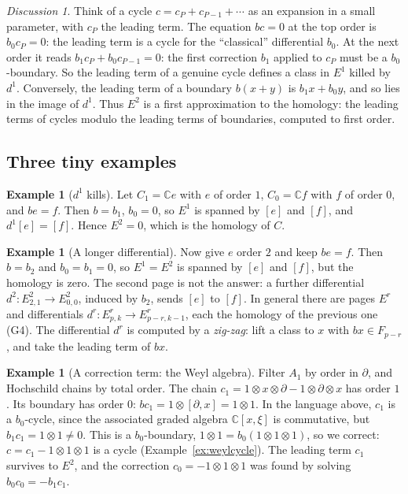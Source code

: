\documentclass[11pt,oneside,reqno]{article}
\newcommand{\C}{\mathbb C}
\newcommand{\pa}{\partial}
\theoremstyle{plain}
\theoremstyle{definition}
\newtheorem{example}[theorem]{Example}
\theoremstyle{remark}
\newtheorem*{discussion}{Discussion}
\begin{document}
\begin{discussion}
Think of a cycle \(c=c_P+c_{P-1}+\cdots\) as an expansion in a small parameter,
with \(c_P\) the leading term. The equation \(bc=0\) at the top order is
\(b_0c_P=0\): the leading term is a cycle for the ``classical'' differential
\(b_0\). At the next order it reads \(b_1c_P+b_0c_{P-1}=0\): the first correction
\(b_1\) applied to \(c_P\) must be a \(b_0\)-boundary. So the leading term of a
genuine cycle defines a class in \(E^1\) killed by \(d^1\). Conversely, the
leading term of a boundary \(b(x+y)\) is \(b_1x+b_0y\), and so lies in the
image of \(d^1\). Thus \(E^2\) is a first approximation to the homology: the
leading terms of cycles modulo the leading terms of boundaries, computed to
first order.
\end{discussion}

\subsection{Three tiny examples}\label{subsec:tiny}
\begin{example}[\(d^1\) kills]\label{ex:tiny1}
Let \(C_1=\C e\) with \(e\) of order \(1\), \(C_0=\C f\) with \(f\) of order \(0\),
and \(be=f\). Then \(b=b_1\), \(b_0=0\), so \(E^1\) is spanned by \([e]\) and \([f]\),
and \(d^1[e]=[f]\). Hence \(E^2=0\), which is the homology of \(C\).
\end{example}

\begin{example}[A longer differential]\label{ex:tiny2}
Now give \(e\) order \(2\) and keep \(be=f\). Then \(b=b_2\) and
\(b_0=b_1=0\), so \(E^1=E^2\) is spanned by \([e]\) and \([f]\), but the homology
is zero. The second page is not the answer: a further differential
\(d^2:E^2_{2,1}\to E^2_{0,0}\), induced by \(b_2\), sends \([e]\) to \([f]\). In
general there are pages \(E^r\) and differentials \(d^r:E^r_{p,k}\to
E^r_{p-r,k-1}\), each the homology of the previous one (G4). The differential
\(d^r\) is computed by a \emph{zig-zag}: lift a class to \(x\) with
\(bx\in F_{p-r}\), and take the leading term of \(bx\).
\end{example}

\begin{example}[A correction term: the Weyl algebra]\label{ex:tiny3}
Filter \(A_1\) by order in \(\pa\), and Hochschild chains by total order. The
chain \(c_1=1\otimes x\otimes\pa-1\otimes\pa\otimes x\) has order \(1\). Its boundary has
order \(0\): \(bc_1=1\otimes[\pa,x]=1\otimes1\). In the language above, \(c_1\) is a
\(b_0\)-cycle, since the associated graded algebra \(\C[x,\xi]\) is commutative,
but \(b_1c_1=1\otimes1\neq0\). This is a \(b_0\)-boundary, \(1\otimes1=b_0(1\otimes1\otimes1)\),
so we correct: \(c=c_1-1\otimes1\otimes1\) is a cycle (Example~\ref{ex:weylcycle}).
The leading term \(c_1\) survives to \(E^2\), and the correction \(c_0=-1\otimes1\otimes1\)
was found by solving \(b_0c_0=-b_1c_1\).
\end{example}
\end{document}

